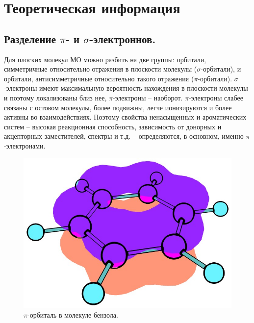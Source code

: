 \newpage
\section{Теоретическая информация}
\subsection{Разделение $\pi$- и $\sigma$-электроннов.}
Для плоских молекул МО можно разбить на две группы: орбитали, симметричные относительно отражения в плоскости молекулы ($\sigma$-орбитали), и орбитали, антисимметричные относительно такого отражения ($\pi$-орбитали). $\sigma$-электроны имеют максимальную вероятность нахождения в плоскости молекулы и поэтому локализованы близ нее, $\pi$-электроны – наоборот. $\pi$-электроны слабее связаны с остовом молекулы, более подвижны, легче ионизируются и более активны во взаимодействиях. Поэтому свойства ненасыщенных и ароматических систем – высокая реакционная способность, зависимость от донорных и акцепторных заместителей, спектры и т.д. – определяются, в основном, именно $\pi$-электронами.

\begin{figure}[H]
\centering
\captionsetup{justification=centering}
\includegraphics[scale=0.4]{fig/2.jpg}
\caption{$\pi$-орбиталь в молекуле бензола.}
\end{figure}


